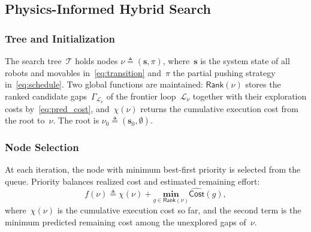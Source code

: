 \subsection{Physics-Informed Hybrid Search}\label{subsec:simloop}

\subsubsection{Tree and Initialization}
The search tree~$\mathcal{T}$ holds nodes
$\nu\triangleq(\mathbf{s},\pi)$, where~$\mathbf{s}$ is the system state of all
robots and movables in~\eqref{eq:transition} and~$\pi$ the partial pushing
strategy in~\eqref{eq:schedule}. Two global functions are maintained:
$\mathsf{Rank}(\nu)$ stores the ranked candidate
gaps~$\Gamma_{\mathcal{L}_\nu}$ of the frontier loop~$\mathcal{L}_\nu$ together
with their exploration costs by~\eqref{eq:pred_cost}, and~$\chi(\nu)$ returns
the cumulative execution cost from the root to~$\nu$. The root is
$\nu_0\triangleq(\mathbf{s}_0,\emptyset)$.

\subsubsection{Node Selection}
At each iteration, the node with minimum best-first priority is selected from
the queue. Priority balances realized cost and estimated remaining effort:
\begin{equation}\label{eq:priority}
  f(\nu)\triangleq \chi(\nu)+\underset{g\in \textsf{Rank}(\nu)}{\textbf{min}}
  \widehat{\mathsf{Cost}}(g),
\end{equation}
where~$\chi(\nu)$ is the cumulative execution cost so far, and the second term
is the minimum predicted remaining cost among the unexplored gaps of~$\nu$.



